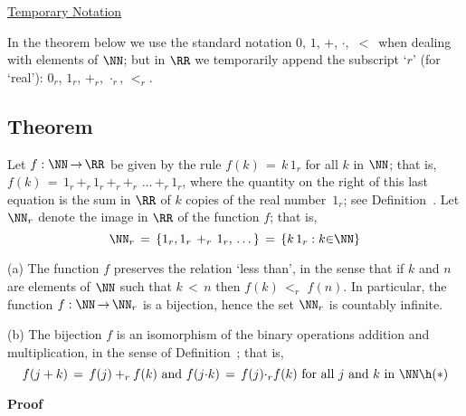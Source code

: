 \V

        \underline{Temporary Notation}

\V

        In the theorem below we use the standard notation $0$, $1$, $+$, ${\cdot}$, $\,<\,$ when dealing with elements of ${\NN}$;
    but in ${\RR}$ we temporarily append the subscript `$r$' (for `real'): $0_{r}$, $1_{r}$, $+_{r}$, ${\cdot}_{r}$, $<_{r}$.

\V
\V

        \subsection{\small{{\bf Theorem}}}
        \label{ThmB25.20}

\V

        Let $f:{\NN} \,{\rightarrow}\, {\RR}$ be given by the rule $f(k) \,=\, k\,1_{r}$ for all $k$ in ${\NN}$;
    that is, $f(k) \,=\, 1_{r}\, +_{r}\, 1_{r}\, +_{r} \,+_{r} \,\,{\ldots}\,+_{r}\, 1_{r}$,  
    where the quantity on the right of this last equation is the sum in ${\RR}$ of $k$ copies of the real number~$1_{r}$;
    see Definition~. Let ${\NN}_{r}$ denote the image in ${\RR}$ of the function $f$; that is,
        \begin{displaymath}
        {\NN}_{r} \,=\, \{1_{r}, 1_{r}\,+_{r}\, 1_{r},\,{\ldots}\,\}
     \,=\, 
        \{k\,1_{r}: k{\in}{\NN}\}
        \end{displaymath}

\V

        (a) The function $f$ preserves the relation `less than', in the sense that if $k$ and $n$ are elements of ${\NN}$ such that $k\,<\,n$ then $f(k)\,<_{r}\,\,f(n)$.
    In particular, the function $f:{\NN} \,{\rightarrow}\, {\NN}_{r}$ is a bijection, hence the set ${\NN}_{r}$ is countably infinite.

\V

        (b) The bijection $f$ is an isomorphism of the binary operations addition and multiplication, in the sense of Definition~;
    that is, 
        \begin{displaymath}
        f(j+k) \,=\, f(j) +_{r} f(k) \mbox{ and } f(j{\cdot}k) \,=\, f(j){\cdot}_{r}f(k) \mbox{ for all $j$ and $k$ in ${\NN}$} \h ({\ast})
        \end{displaymath}

\V

        {\bf Proof}

\V

